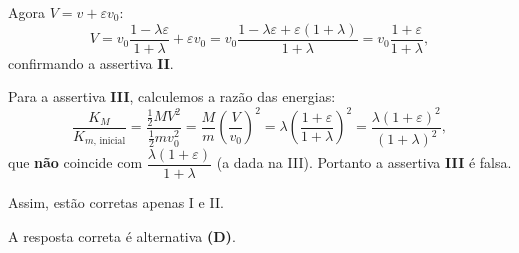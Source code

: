 \documentclass[a4paper,12pt]{article}
\begin{document}
\begin{flushleft}
Agora $V=v+\varepsilon v_0$:
\[
V=v_0\frac{1-\lambda\varepsilon}{1+\lambda}+\varepsilon v_0
= v_0\frac{1-\lambda\varepsilon+\varepsilon(1+\lambda)}{1+\lambda}
= v_0\frac{1+\varepsilon}{1+\lambda},
\]
confirmando a assertiva \textbf{II}.

Para a assertiva \textbf{III}, calculemos a raz\~ao das energias:
\[
\frac{K_M}{K_{m,\,\text{inicial}}}
=\frac{\tfrac{1}{2}M V^2}{\tfrac{1}{2}m v_0^2}
=\frac{M}{m}\left(\frac{V}{v_0}\right)^2
=\lambda\left(\frac{1+\varepsilon}{1+\lambda}\right)^2
=\frac{\lambda(1+\varepsilon)^2}{(1+\lambda)^2},
\]
que \textbf{não} coincide com $\dfrac{\lambda(1+\varepsilon)}{1+\lambda}$ (a dada na III). Portanto a assertiva \textbf{III} é falsa.

Assim, est\~ao corretas apenas I e II.

A resposta correta é alternativa \colorbox{green!50}{\textbf{(D)}}.

\end{flushleft}
\end{document}
